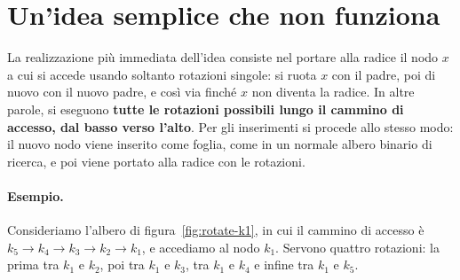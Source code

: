 \section{Un'idea semplice che non funziona}\label{sec:rotate-to-root}
La realizzazione più immediata dell'idea consiste nel portare alla radice il nodo $x$ a cui si accede usando soltanto rotazioni singole: si ruota $x$ con il padre, poi di nuovo con il nuovo padre, e così via finché $x$ non diventa la radice. In altre parole, si eseguono \textbf{tutte le rotazioni possibili lungo il cammino di accesso, dal basso verso l'alto}. Per gli inserimenti si procede allo stesso modo: il nuovo nodo viene inserito come foglia, come in un normale albero binario di ricerca, e poi viene portato alla radice con le rotazioni.

\paragraph{Esempio.}
Consideriamo l'albero di figura~\ref{fig:rotate-k1}, in cui il cammino di accesso è $k_5 \to k_4 \to k_3 \to k_2 \to k_1$, e accediamo al nodo $k_1$. Servono quattro rotazioni: la prima tra $k_1$ e $k_2$, poi tra $k_1$ e $k_3$, tra $k_1$ e $k_4$ e infine tra $k_1$ e $k_5$.

